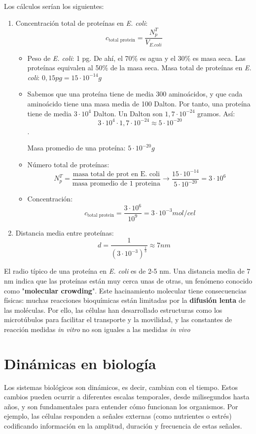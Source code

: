 Los cálculos serían los siguientes:
\begin{enumerate}
\item Concentración total de proteínas en \textit{E. coli}:
$$c_{\text{total protein}} = \frac{N^T_p}{V_{E.coli}}$$
\begin{itemize}
\item Peso de \textit{E. coli}: 1 pg. De ahí, el 70\% es agua y el 30\% es masa seca. Las proteínas equivalen al 50\% de la masa seca. Masa total de proteínas en \textit{E. coli}: $0,15 pg = 15 \cdot 10^{-14} g$
\item Sabemos que una proteína tiene de media 300 aminoácidos, y que cada aminoácido tiene una masa media de 100 Dalton. Por tanto, una proteína tiene de media  $3 \cdot 10^4$ Dalton. Un Dalton son $1,7 \cdot 10^{-24}$ gramos. Así:
$$3\cdot 10^4 \cdot 1,7 \cdot 10^{-24} \approx 5 \cdot 10^{-20}$$. 

Masa promedio de una proteína: $5 \cdot 10^{-20} g$

\item Número total de proteínas:
$$N^T_p = \frac{\text{masa total de prot en E. coli}}{\text{masa promedio de 1 proteina}} \rightarrow \frac{15 \cdot 10^{-14}}{5 \cdot 10^{-20}} = 3 \cdot 10^6$$
\item Concentración:
$$c_{\text{total protein}} = \frac{3 \cdot 10^6}{10^9} = 3 \cdot 10^{-3} mol/cel$$
\end{itemize}
\item Distancia media entre proteínas:
$$d = \frac{1}{(3 \cdot 10^{-3})^{\frac{1}{3}}} \approx 7nm$$
\end{enumerate}

El radio típico de una proteína en \textit{E. coli} es de 2-5 nm. Una distancia media de 7 nm indica que las proteínas están muy cerca unas de otras, un fenómeno conocido como "\textbf{molecular crowding}".
Este hacinamiento molecular tiene consecuencias físicas: muchas reacciones bioquímicas están limitadas por la \textbf{difusión lenta} de las moléculas. Por ello, las células han desarrollado estructuras como los microtúbulos para facilitar el transporte y la movilidad, y las constantes de reacción medidas \textit{in vitro} no son iguales a las medidas \textit{in vivo}

\section{Dinámicas en biología}
Los sistemas biológicos son dinámicos, es decir, cambian con el tiempo. Estos cambios pueden ocurrir a diferentes escalas temporales, desde milisegundos hasta años, y son fundamentales para entender cómo funcionan los organismos. Por ejemplo, las células responden a señales externas (como nutrientes o estrés) codificando información en la amplitud, duración y frecuencia de estas señales.

